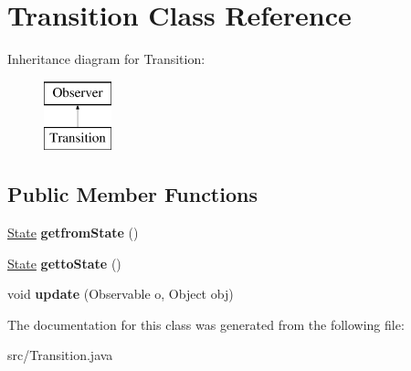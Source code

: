 \hypertarget{class_transition}{\section{Transition Class Reference}
\label{class_transition}
}
Inheritance diagram for Transition\-:\begin{figure}[H]
\begin{center}
\leavevmode
\includegraphics[height=2.000000cm]{class_transition}
\end{center}
\end{figure}
\subsection*{Public Member Functions}
\begin{DoxyCompactItemize}
\item 
\hypertarget{class_transition_acee1af44b7d58aa1c02976738dcfaf80}{\hyperlink{class_state}{State} {\bfseries getfrom\-State} ()}\label{class_transition_acee1af44b7d58aa1c02976738dcfaf80}

\item 
\hypertarget{class_transition_a11d7374ead7d8114485507b77925b797}{\hyperlink{class_state}{State} {\bfseries getto\-State} ()}\label{class_transition_a11d7374ead7d8114485507b77925b797}

\item 
\hypertarget{class_transition_ad22714a1e7afd83b110191669f6447f9}{void {\bfseries update} (Observable o, Object obj)}\label{class_transition_ad22714a1e7afd83b110191669f6447f9}

\end{DoxyCompactItemize}


The documentation for this class was generated from the following file\-:\begin{DoxyCompactItemize}
\item 
src/Transition.\-java\end{DoxyCompactItemize}
